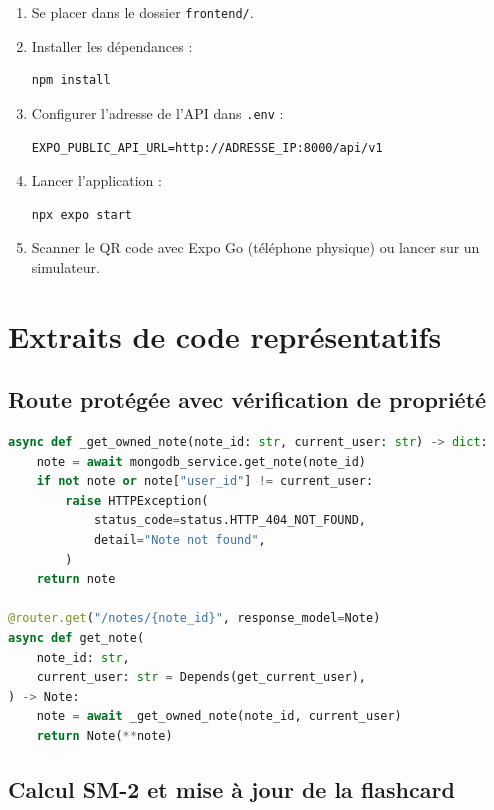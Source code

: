 \documentclass[12pt,a4paper]{report}
\begin{document}
\begin{enumerate}
    \item Se placer dans le dossier \texttt{frontend/}.
    \item Installer les dépendances :
\begin{lstlisting}[language=bash]
npm install
\end{lstlisting}
    \item Configurer l'adresse de l'API dans \texttt{.env} :
\begin{lstlisting}
EXPO_PUBLIC_API_URL=http://ADRESSE_IP:8000/api/v1
\end{lstlisting}
    \item Lancer l'application :
\begin{lstlisting}[language=bash]
npx expo start
\end{lstlisting}
    \item Scanner le QR code avec Expo Go (téléphone physique) ou lancer sur un simulateur.
\end{enumerate}

\chapter{Extraits de code représentatifs}

\section{Route protégée avec vérification de propriété}

\begin{lstlisting}[language=Python]
async def _get_owned_note(note_id: str, current_user: str) -> dict:
    note = await mongodb_service.get_note(note_id)
    if not note or note["user_id"] != current_user:
        raise HTTPException(
            status_code=status.HTTP_404_NOT_FOUND,
            detail="Note not found",
        )
    return note

@router.get("/notes/{note_id}", response_model=Note)
async def get_note(
    note_id: str,
    current_user: str = Depends(get_current_user),
) -> Note:
    note = await _get_owned_note(note_id, current_user)
    return Note(**note)
\end{lstlisting}

\section{Calcul SM-2 et mise à jour de la flashcard}
\end{document}
